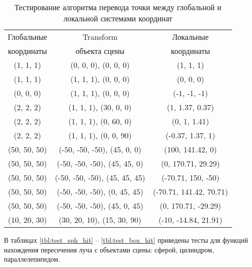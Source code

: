 \begin{table}[h]
	\begin{center}
		\begin{threeparttable}
			\captionsetup{justification=raggedright,singlelinecheck=off}
			\caption{Тестирование алгоритма перевода точки между глобальной и локальной системами координат}
			\label{tbl:local-global}
			\begin{tabular}{|c|c|c|}
				\hline
				Глобальные & Transform & Локальные \\
				координаты & объекта сцены & координаты \\
				\hline
				(1, 1, 1) & (0, 0, 0), (0, 0, 0) & (1, 1, 1)   \\
				\hline
				(1, 1, 1) & (1, 1, 1), (0, 0, 0) & (0, 0, 0)   \\
				\hline
				(0, 0, 0) & (1, 1, 1), (0, 0, 0) & (-1, -1, -1)   \\
				\hline
				(2, 2, 2) & (1, 1, 1), (30, 0, 0) & (1, 1.37, 0.37)   \\
				\hline
				(2, 2, 2) & (1, 1, 1), (0, 60, 0) & (0, 1, 1.41)   \\
				\hline
				(2, 2, 2) & (1, 1, 1), (0, 0, 90) & (-0.37, 1.37, 1)   \\
				\hline
				(50, 50, 50) & (-50, -50, -50), (45, 0, 0) & (100, 141.42, 0)\\
				\hline
				(50, 50, 50) & (-50, -50, -50), (45, 45, 0) & (0, 170.71, 29.29)\\
				\hline
				(50, 50, 50) & (-50, -50, -50), (45, 45, 45) & (-70.71, 150, -50)\\
				\hline
				(50, 50, 50) & (-50, -50, -50), (0, 45, 45) & (-70.71, 141.42, 70.71)\\
				\hline
				(50, 50, 50) & (-50, -50, -50), (45, 0, 45) & (0, 170.71, -29.29)\\
				\hline
				(10, 20, 30) & (30, 20, 10), (15, 30, 90) & (-10, -14.84, 21.91)\\
				\hline
			\end{tabular}
		\end{threeparttable}
	\end{center}
\end{table}

В таблицах \ref{tbl:test_sph_hit} -- \ref{tbl:test_box_hit} приведены тесты для функций нахождения пересечения луча с объектами сцены: сферой, цилиндром, параллелепипедом.

\clearpage

